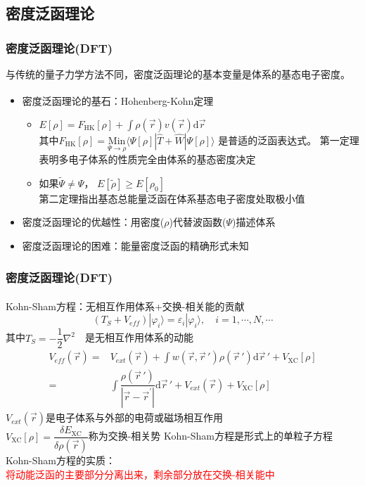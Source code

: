 \documentclass[cjk,slidestop,compress,mathserif,blue]{beamer}
\newcommand{\upcite}[1]{\hspace{0ex}\textsuperscript{\cite{#1}}} %
\begin{document}
\subsection{密度泛函理论}       %
\frame                               %
{
\frametitle{密度泛函理论(\textrm{DFT})} %
与传统的量子力学方法不同，密度泛函理论的基本变量是体系的基态电子密度。%
\begin{itemize}%
	\item 密度泛函理论的基石：\textrm{Hohenberg-Kohn}定理\upcite{PR136-B864_1964}
\vskip 5pt
\begin{itemize}%
   \setlength{\itemsep}{8pt}
 \item $E[\rho]=F_{\mathrm{HK}}[\rho]+\displaystyle\int\rho(\vec{r})v(\vec{r})\textrm{d}\vec{r}$ \\
\vskip 5pt 其中$F_{\mathrm{HK}}[\rho]=\underset{\Psi\to\rho}{\mathrm{Min}}\langle\Psi[\rho]|\hat{T}+\hat{W}|\Psi[\rho]\rangle$
是普适的泛函表达式。%
     \textrm{\small{第一定理表明多电子体系的性质完全由体系的基态密度决定}}
   \item 如果$\tilde\Psi\neq\Psi$，
     $E[\tilde\rho]\geqslant E[\rho_0]$\\
     \textrm{\small{第二定理指出基态总能量泛函在体系基态电子密度处取极小值}}
   \end{itemize}
\vskip 8pt
 \item 密度泛函理论的优越性：用密度($\rho$)代替波函数($\Psi$)描述体系
\vskip 5pt
 \item 密度泛函理论的困难：能量密度泛函的精确形式未知
   \end{itemize}
}

\frame                               %
{
\frametitle{密度泛函理论(\textrm{DFT})}
\textrm{Kohn-Sham}方程\upcite{PR140-A1133_1965}：无相互作用体系+交换-相关能的贡献
$$(T_S+V_{e\!f\!f})|\varphi_i\rangle=\varepsilon_i|\varphi_i\rangle,\quad i=1,\cdots,N,\cdots$$
其中$T_S=-\dfrac12\nabla^2$~~是无相互作用体系的动能
\begin{displaymath}
	\begin{aligned}
		V_{e\!f\!f}(\vec r)=&V_{ext}(\vec r)+\displaystyle\int w(\vec r,\vec r\,')\rho(\vec r\,')\mathrm{d}\vec r\,'+V_{\mathrm{XC}}[\rho]\\
=&\displaystyle\int\dfrac{\rho(\vec r\,')}{|\vec r-\vec r^{\prime}|}\mathrm{d}\vec r\,'+V_{ext}(\vec r)+V_{\mathrm{XC}}[\rho]
	\end{aligned}
\end{displaymath}
$V_{ext}(\vec r)$是电子体系与外部的电荷或磁场相互作用\\
$V_{\mathrm{XC}}[\rho]=\dfrac{\delta E_{\mathrm{XC}}}{\delta\rho(\vec r)}$称为交换-相关势
\vskip 10pt
\textrm{Kohn-Sham}方程是形式上的单粒子方程
\vskip 6pt
\textrm{Kohn-Sham}方程的实质：\\\textcolor{red}{将动能泛函的主要部分分离出来，剩余部分放在交换-相关能中}
}
\end{document}
